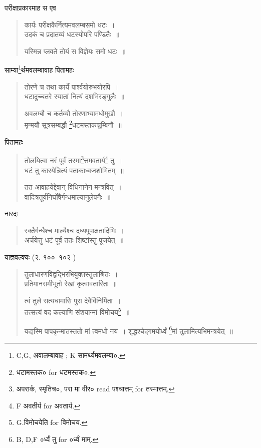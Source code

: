 \documentclass[11pt, openany]{book}
\begin{document}
परीक्षाप्रकारमाह स एव 

\begin{quote}
{\vy कार्यः परीक्षकैर्नित्यमवलम्बसमो धटः~।\\
उदकं च प्रदातव्यं धटस्योपरि पण्डितैः~॥

यस्मिन्न प्लवते तोयं स विज्ञेयः समो धटः~॥}
\end{quote}

साम्या\renewcommand{\thefootnote}{4}\footnote{C,G, अवालम्बावाह ; K सामर्थ्यमवलम्बा०.}र्थमवलम्बावाह पितामहः

\begin{quote}
{\vy तोरणे च तथा कार्ये पार्श्वयोरुभयोरपि~।\\
धटादुच्चतरे स्यातां नित्यं दशभिरङ्गुलैः~॥

अवलम्बौ च कर्तव्यौ तोरणाभ्यामधोमुखौ~।\\
मृन्मयौ सूत्रसम्बद्धौ \renewcommand{\thefootnote}{5}\footnote{धटामस्तक० for धटमस्तक०.}धटमस्तकचुम्बिनौ~॥}
\end{quote}

पितामहः

\begin{quote}
{\vy तोलयित्वा नरं पूर्वं तस्मा\renewcommand{\thefootnote}{6}\footnote{अपरार्क, स्मृतिच०, परा मा वीर० read पश्चात्तम् for तस्मात्तम्.}त्तमवतार्य\renewcommand{\thefootnote}{7}\footnote{F अवतीर्य for अवतार्य.} तु~।\\
धटं तु कारयेन्नित्यं पताकाध्वजशोभितम्~॥

तत आवाहयेद्देवान् विधिनानेन मन्त्रवित्~।\\
वादित्रतूर्यनिर्घोषैर्गन्धमाल्यानुलेपनैः~॥}
\end{quote}

\newpage 

नारदः 

\begin{quote}
{\vy रक्तैर्गन्धैश्च माल्यैश्च दध्यपूपाक्षतादिभिः~।\\
अर्चयेत्तु धटं पूर्वं ततः शिष्टांस्तु पूजयेत्~॥}
\end{quote}

याज्ञवल्क्यः (२. १००\textendash\ १०२ )

\begin{quote}
{\vy तुलाधारणविद्वद्भिरभियुक्तस्तुलाश्रितः~।\\
प्रतिमानसमीभूतो रेखां कृत्वावतारितः~॥

त्वं तुले सत्यधामासि पुरा देवैर्विनिर्मिता~।\\
तत्सत्यं वद कल्याणि संशयान्मां विमोचय\renewcommand{\thefootnote}{1}\footnote{G.विमोचयेति for विमोचय.}~॥

यद्यस्मि पापकृन्मातस्ततो मां त्वमधो नय~।
शुद्धश्चेद्गमयोर्ध्वं \renewcommand{\thefootnote}{2}\footnote{B, D,F ०र्ध्वं तु for ०र्ध्वं माम्.}मां तुलामित्यभिमन्त्रयेत्~॥}
\end{quote}
\end{document}

